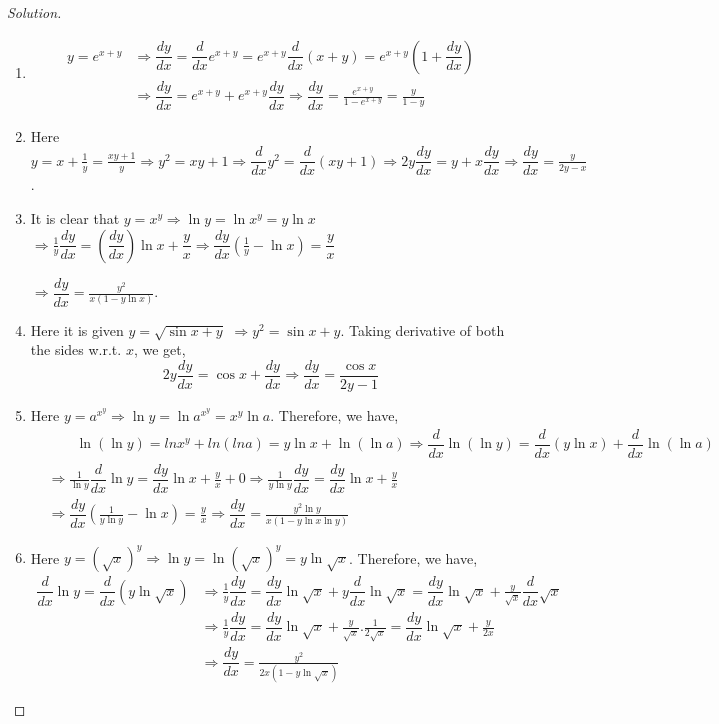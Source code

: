 \documentclass[../../main.tex]{subfiles}
\theoremstyle{definition}
\newenvironment{solution}
    {\begin{proof}[Solution]}
    {\end{proof}}
\begin{document}
\begin{solution}
\begin{enumerate}[label=(\roman*)]

\item 
\begin{align*}
y=e^{x+y} &\Rightarrow \dfrac{dy}{dx}= \dfrac{d}{dx}e^{x+y}=e^{x+y}\dfrac{d}{dx}(x+y) = e^{x+y}\left(1+\dfrac{dy}{dx}\right) \\
&\Rightarrow \dfrac{dy}{dx}=e^{x+y}+e^{x+y}\dfrac{dy}{dx}\Rightarrow \dfrac{dy}{dx}= \frac{e^{x+y}}{1-e^{x+y}}=\frac{y}{1-y}
\end{align*}

\item Here $y=x+\frac{1}{y}=\frac{xy+1}{y} \Rightarrow y^2=xy+1 \Rightarrow \dfrac{d}{dx}y^2=\dfrac{d}{dx}(xy+1) \Rightarrow 2y\dfrac{dy}{dx}=y+x\dfrac{dy}{dx} \Rightarrow \dfrac{dy}{dx}=\frac{y}{2y-x}$.

\item It is clear that $y=x^y\Rightarrow \ln y = \ln x^y=y\ln x$ $\Rightarrow \frac{1}{y}\dfrac{dy}{dx}=(\dfrac{dy}{dx})\ln x+\dfrac{y}{x} \Rightarrow \dfrac{dy}{dx}(\frac{1}{y}-\ln x)=\dfrac{y}{x}$ 

$\Rightarrow \dfrac{dy}{dx}=\frac{y^2}{x(1-y\ln x)}$.

\item Here it is given $y=\sqrt{\sin x+y}$
$\Rightarrow y^2=\sin x+y$. Taking derivative of both the sides w.r.t. $x$, we get, 
\[
2y\dfrac{dy}{dx}= \cos x+\dfrac{dy}{dx} \Rightarrow \dfrac{dy}{dx}=\frac{\cos x}{2y-1}
\]

\item Here $y=a^{{x}^y}\Rightarrow \ln y=\ln a^{{x}^y}= x^y\ln a$. Therefore, we have, \begin{align*}
    &\qquad \ln(\ln y)=lnx^y+ln(ln a)=y\ln x+\ln (\ln a) \Rightarrow \dfrac{d}{dx}\ln (\ln y)=\dfrac{d}{dx}(y \ln x)+\dfrac{d}{dx}\ln (\ln a) \\
    &\Rightarrow \frac{1}{\ln y}\dfrac{d}{dx}\ln y=\dfrac{dy}{dx}\ln x+\frac{y}{x}+0 \Rightarrow \frac{1}{y\ln y}\dfrac{dy}{dx}=\dfrac{dy}{dx}\ln x+\frac{y}{x} \\
    &\Rightarrow \dfrac{dy}{dx}(\frac{1}{y\ln y}-\ln x)=\frac{y}{x} \Rightarrow \dfrac{dy}{dx}=\frac{y^2\ln y}{x(1-y\ln x\ln y)}
\end{align*} 

\item Here $y=(\sqrt{x})^y\Rightarrow \ln y=\ln (\sqrt{x})^y= y\ln \sqrt{x}$. Therefore, we have,
\begin{align*}
   \dfrac{d}{dx}\ln y = \dfrac{d}{dx}(y \ln \sqrt{x}) &\Rightarrow \frac{1}{y}\dfrac{dy}{dx}=\dfrac{dy}{dx}\ln \sqrt{x}+y\dfrac{d}{dx}\ln \sqrt{x} = \dfrac{dy}{dx}\ln \sqrt{x}+\frac{y}{\sqrt{x}}\dfrac{d}{dx}\sqrt{x} \\
   &\Rightarrow \frac{1}{y}\dfrac{dy}{dx}=\dfrac{dy}{dx}\ln \sqrt{x}+\frac{y}{\sqrt{x}}.\frac{1}{2\sqrt{x}}=\dfrac{dy}{dx}\ln \sqrt{x}+\frac{y}{2x} \\
   &\Rightarrow \dfrac{dy}{dx}=\frac{y^2}{2x(1-y\ln \sqrt{x})}
\end{align*}


\end{enumerate}
\end{solution}
\end{document}
